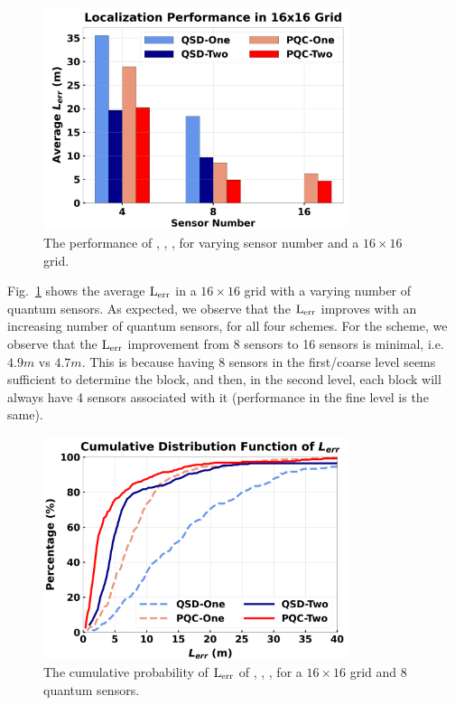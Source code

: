 \begin{figure}[ht]
    \centering
    \includegraphics[width=0.8\textwidth]{chapters/qce/figures/continuous.varysensornum.png}
    \caption{The performance of \povmone, \povm, \pqcone, \pqctwo for varying sensor number and a $16\times16$ grid.}
    \label{fig:continuous.varysen}
\end{figure}

Fig.~\ref{fig:continuous.varysen} shows the average $\mathrm{L_{err}}$ in a $16\times16$ grid with a varying number of quantum sensors.
As expected, we observe that the $\mathrm{L_{err}}$ improves with an increasing number of quantum sensors,
for all four schemes.
For the \pqctwo scheme, we observe that the $\mathrm{L_{err}}$ improvement from 8 sensors to 16 sensors is minimal, i.e. $4.9 m$ vs $4.7 m$. 
This is because having 8 sensors in the first/coarse level seems sufficient to determine the block,
and then, in the second level, each block will always have 4 sensors associated with it (performance in the fine level is the same). 

\begin{figure}[ht]
    \centering
    \includegraphics[width=0.8\textwidth]{chapters/qce/figures/error_cdf.png}
    \caption{The cumulative probability of $\mathrm{L_{err}}$ of \povmone, \povm, \pqcone, \pqctwo for a $16\times16$ grid and 8 quantum sensors.}
    \label{fig:continuous.errorcdf}
\end{figure}

